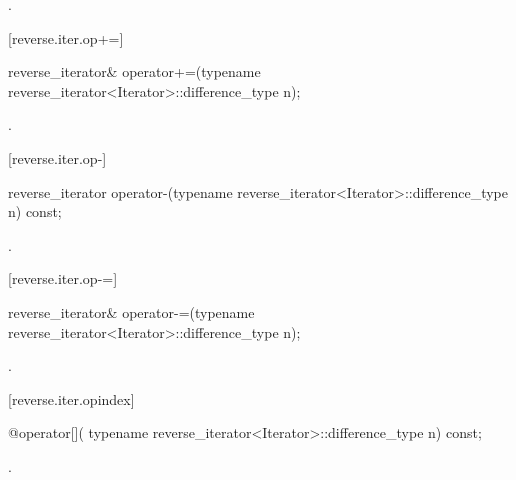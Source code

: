 \begin{itemdescr}
\pnum
\returns
{}.
\end{itemdescr}

[reverse.iter.op+=]{}

%
\begin{itemdecl}
reverse_iterator&
operator+=(typename reverse_iterator<Iterator>::difference_type n);
\end{itemdecl}

\begin{itemdescr}
\pnum
\effects
{}

\pnum
\returns
{}.
\end{itemdescr}

[reverse.iter.op-]{}

%
\begin{itemdecl}
reverse_iterator
operator-(typename reverse_iterator<Iterator>::difference_type n) const;
\end{itemdecl}

\begin{itemdescr}
\pnum
\returns
{}.
\end{itemdescr}

[reverse.iter.op-=]{}

%
\begin{itemdecl}
reverse_iterator&
operator-=(typename reverse_iterator<Iterator>::difference_type n);
\end{itemdecl}

\begin{itemdescr}
\pnum
\effects
{}

\pnum
\returns
{}.
\end{itemdescr}

[reverse.iter.opindex]{}

%
\begin{itemdecl}
@\unspec@ operator[](
    typename reverse_iterator<Iterator>::difference_type n) const;
\end{itemdecl}

\begin{itemdescr}
\pnum
\returns
{}.
\end{itemdescr}

